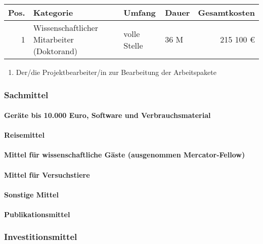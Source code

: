\documentclass[de]{dfg-proposal}
\begin{document}
\begin{tabularx}{\linewidth}{rXllr}
    \toprule
    Pos. & Kategorie                                  & Umfang       & Dauer & Gesamtkosten \\
    \midrule
    1    & Wissenschaftlicher Mitarbeiter (Doktorand) & volle Stelle & 36 M  & 215 100 €    \\
    \bottomrule
\end{tabularx}

\begin{enumerate}
    \item Der/die Projektbearbeiter/in zur Bearbeitung der Arbeitspakete
\end{enumerate}

\subsubsection{Sachmittel}

\paragraph{Geräte bis 10.000 Euro, Software und Verbrauchsmaterial}

\paragraph{Reisemittel}

\paragraph{Mittel für wissenschaftliche Gäste (ausgenommen Mercator-Fellow)}

\paragraph{Mittel für Versuchstiere}

\paragraph{Sonstige Mittel}

\paragraph{Publikationsmittel}

\subsubsection{Investitionsmittel}
\end{document}
